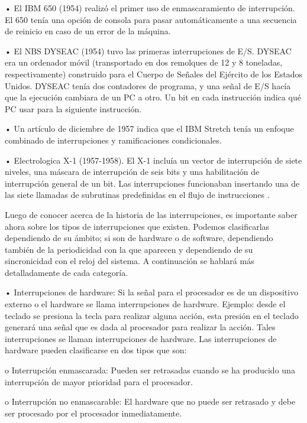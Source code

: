 \documentclass[12pt]{article}
\begin{document}
{•	El IBM 650 (1954) realizó el primer uso de enmascaramiento de interrupción. El 650 tenía una opción de consola para pasar automáticamente a una secuencia de reinicio en caso de un error de la máquina.

•	El NBS DYSEAC (1954) tuvo las primeras interrupciones de E/S. DYSEAC era un ordenador móvil (transportado en dos remolques de 12 y 8 toneladas, respectivamente) construido para el Cuerpo de Señales del Ejército de los Estados Unidos. DYSEAC tenía dos contadores de programa, y una señal de E/S hacía que la ejecución cambiara de un PC a otro. Un bit en cada instrucción indica qué PC usar para la siguiente instrucción.

•	Un artículo de diciembre de 1957 indica que el IBM Stretch tenía un enfoque combinado de interrupciones y ramificaciones condicionales.

•	Electrologica X-1 (1957-1958). El X-1 incluía un vector de interrupción de siete niveles, una máscara de interrupción de seis bits y una habilitación de interrupción general de un bit. Las interrupciones funcionaban insertando una de las siete llamadas de subrutinas predefinidas en el flujo de instrucciones \citep{Hist}.
\newline

Luego de conocer acerca de la historia de las interrupciones, es importante saber ahora sobre los tipos de interrupciones que existen. Podemos clasificarlas dependiendo de su ámbito; si son de hardware o de software, dependiendo también de la periodicidad con la que aparecen y dependiendo de su sincronicidad con el reloj del sistema. A continuación se hablará más detalladamente de cada categoría.
\newline

•	Interrupciones de hardware: Si la señal para el procesador es de un dispositivo externo o el hardware se llama interrupciones de hardware. Ejemplo: desde el teclado se presiona la tecla para realizar alguna acción, esta presión en el teclado generará una señal que es dada al procesador para realizar la acción. Tales interrupciones se llaman interrupciones de hardware. Las interrupciones de hardware pueden clasificarse en dos tipos que son:

\hspace{10mm}o	Interrupción enmascarada: Pueden ser retrasadas cuando se ha producido una interrupción de mayor prioridad para el procesador.
    
\hspace{10mm}o	Interrupción no enmascarable: El hardware que no puede ser retrasado y debe ser procesado por el procesador inmediatamente.
\newline

}
\end{document}
